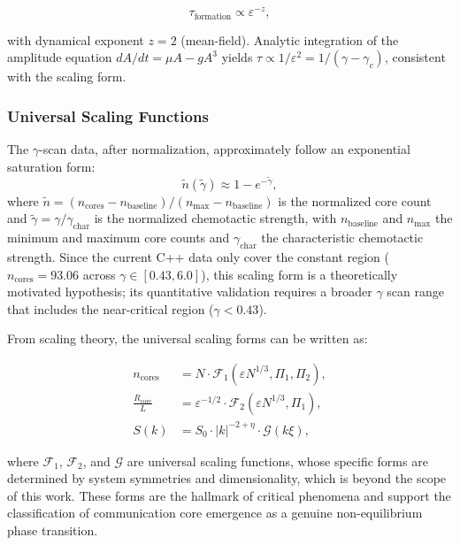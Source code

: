\documentclass[sn-nature,pdflatex]{sn-jnl}
\begin{document}
\begin{equation}
\tau_{\text{formation}} \propto \varepsilon^{-z},
\end{equation}

with dynamical exponent $z = 2$ (mean-field).
Analytic integration of the amplitude equation $dA/dt = \mu A - g A^3$ yields $\tau \propto 1/\varepsilon^2 = 1/(\gamma - \gamma_c)$, consistent with the scaling form.

\subsubsection{Universal Scaling Functions}

The $\gamma$-scan data, after normalization, approximately follow an exponential saturation form:
\begin{equation}
\label{eq:scaling}
\tilde{n}(\tilde{\gamma}) \approx 1 - e^{-\tilde{\gamma}},
\end{equation}
where $\tilde{n} = (n_{\text{cores}} - n_{\text{baseline}})/(n_{\text{max}} - n_{\text{baseline}})$ is the normalized core count and $\tilde{\gamma} = \gamma / \gamma_{\text{char}}$ is the normalized chemotactic strength, with $n_{\text{baseline}}$ and $n_{\text{max}}$ the minimum and maximum core counts and $\gamma_{\text{char}}$ the characteristic chemotactic strength. Since the current C++ data only cover the constant region ($n_{\text{cores}} = 93.06$ across $\gamma \in [0.43, 6.0]$), this scaling form is a theoretically motivated hypothesis; its quantitative validation requires a broader $\gamma$ scan range that includes the near-critical region ($\gamma < 0.43$).

From scaling theory, the universal scaling forms can be written as:

\begin{align}
n_{\text{cores}} &= N \cdot \mathcal{F}_1(\varepsilon N^{1/3}, \Pi_1, \Pi_2), \\
\frac{R_{\text{core}}}{L} &= \varepsilon^{-1/2} \cdot \mathcal{F}_2(\varepsilon N^{1/3}, \Pi_1), \\
S(k) &= S_0 \cdot |k|^{-2+\eta} \cdot \mathcal{G}(k \xi),
\end{align}

where $\mathcal{F}_1$, $\mathcal{F}_2$, and $\mathcal{G}$ are universal scaling functions, whose specific forms are determined by system symmetries and dimensionality, which is beyond the scope of this work.
These forms are the hallmark of critical phenomena and support the classification of communication core emergence as a genuine non-equilibrium phase transition.
\end{document}

